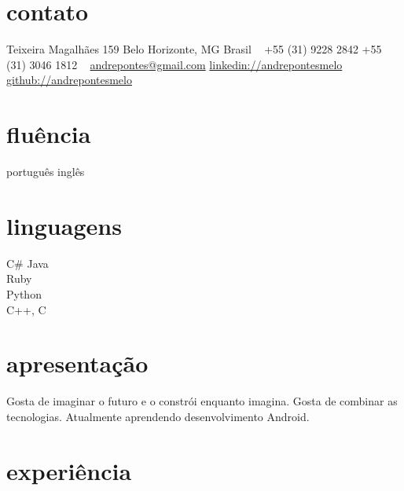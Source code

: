 \documentclass[]{friggeri-cv}
\begin{document}


\begin{aside} %
\section{contato}
Teixeira Magalhães 159
Belo Horizonte, MG
Brasil
~
+55 (31) 9228 2842
+55 (31) 3046 1812
~
\href{mailto:andrepontes@gmail.com}{andrepontes@gmail.com}
\href{https://br.linkedin.com/in/andrepontesmelo}{linkedin://andrepontesmelo}
\href{https://github.com/andrepontesmelo}{github://andrepontesmelo}
\section{fluência}
português
inglês 
\section{linguagens}
C\#
Java\\Ruby\\Python\\C++, C
\end{aside}

\section{apresentação}
Gosta de imaginar o futuro e o constrói enquanto imagina. Gosta de combinar as tecnologias. 
Atualmente aprendendo desenvolvimento Android.

\section{experiência}
\end{document}
